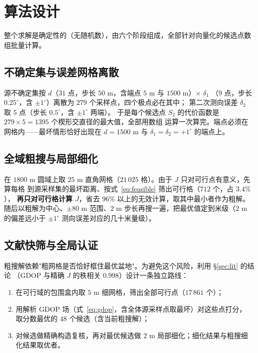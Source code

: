 \section{算法设计}\label{sec:algo}

整个求解是确定性的（无随机数），由六个阶段组成，全部针对向量化的候选点数组批量计算。

\subsection{不确定集与误差网格离散}

源不确定集按 $d$（$31$ 点，步长 $50$ m，含端点 $5$ m 与 $1500$ m）$\times$ $\delta_1$
（$9$ 点，步长 $0.25^\circ$，含 $\pm1^\circ$）离散为 $279$ 个采样点，四个极点必在其中；
第二次测向误差 $\delta_2$ 取 $5$ 点（步长 $0.5^\circ$，含 $\pm1^\circ$ 两端）。
于是每个候选点 $S_2$ 的代价函数是 $279\times5=1395$ 个楔形交直径的最大值，全部用数组
运算一次算完。端点必须在网格内——最坏情形恰好出现在 $d=1500$ m 与 $\delta_1=\delta_2=+1^\circ$
的端点上。

\subsection{全域粗搜与局部细化}

在 $1800$ m 圆域上取 $25$ m 直角网格（$21\,025$ 格）。由于 $J$ 只对可行点有意义，先算每格
到源采样集的最坏距离、按式~\eqref{eq:feasible} 筛出可行格（$712$ 个，占 $3.4\%$），
\textbf{再只对可行格计算 $J$}，省去 $96\%$ 以上的无效计算，取其中最小者作为粗解。
随后以粗解为中心、$\pm80$ m 范围、$2$ m 步长再搜一遍，把最优值定到米级（$2$ m 的偏差远小于
$\pm1^\circ$ 测向误差对应的几十米量级）。

\subsection{文献快筛与全局认证}

粗搜解依赖"粗网格是否恰好框住最优盆地"。为避免这个风险，利用 §\ref{sec:lit} 的结论
（GDOP 与精确 $J$ 的秩相关 $0.998$）设计一条独立路线：

\begin{enumerate}
  \item 在可行域的包围盒内取 $5$ m 细网格，筛出全部可行点（$17\,861$ 个）；
  \item 用解析 GDOP 场（式~\eqref{eq:gdop}，含全体源采样点取最坏）对这些点打分，
        取分数最优的 $48$ 个候选（含当前粗搜解）；
  \item 对候选做精确构造复核，再对最优候选做 $2$ m 局部细化；细化结果与粗搜细化结果取优者。
\end{enumerate}

